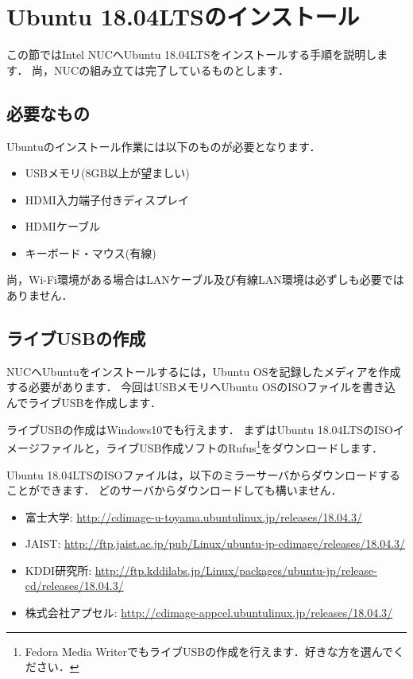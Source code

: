 \documentclass[{../../master}]{subfiles}
\begin{document}
\section{Ubuntu 18.04LTSのインストール}

この節ではIntel NUCへUbuntu 18.04LTSをインストールする手順を説明します．
尚，NUCの組み立ては完了しているものとします．

\subsection{必要なもの}

Ubuntuのインストール作業には以下のものが必要となります．

\begin{itemize}
  \item USBメモリ(8GB以上が望ましい)
  \item HDMI入力端子付きディスプレイ
  \item HDMIケーブル
  \item キーボード・マウス(有線)
\end{itemize}

尚，Wi-Fi環境がある場合はLANケーブル及び有線LAN環境は必ずしも必要ではありません．

\subsection{ライブUSBの作成}

NUCへUbuntuをインストールするには，Ubuntu OSを記録したメディアを作成する必要があります．
今回はUSBメモリへUbuntu OSのISOファイルを書き込んでライブUSBを作成します．

ライブUSBの作成はWindows10でも行えます．
まずはUbuntu 18.04LTSのISOイメージファイルと，ライブUSB作成ソフトの\textsf{Rufus}\footnote{Fedora Media WriterでもライブUSBの作成を行えます．好きな方を選んでください．}をダウンロードします．

Ubuntu 18.04LTSのISOファイルは，以下のミラーサーバからダウンロードすることができます．
どのサーバからダウンロードしても構いません．

\begin{itemize}
  \item 富士大学: \url{http://cdimage-u-toyama.ubuntulinux.jp/releases/18.04.3/}
  \item JAIST: \url{http://ftp.jaist.ac.jp/pub/Linux/ubuntu-jp-cdimage/releases/18.04.3/}
  \item KDDI研究所: \url{http://ftp.kddilabs.jp/Linux/packages/ubuntu-jp/release-cd/releases/18.04.3/}
  \item 株式会社アプセル: \url{http://cdimage-appcel.ubuntulinux.jp/releases/18.04.3/}
\end{itemize}
\end{document}
